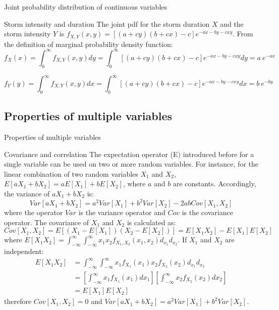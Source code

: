 \documentclass[8pt]{beamer}
\renewcommand{\emph}[1]{\textcolor{myorange}{#1}}
\begin{document}
\begin{frame}{Joint probability distribution of continuous variables}
    \begin{exampleblock}{Storm intensity and duration}
        The joint \emph{pdf} for the storm duration $X$ and the storm intensity $Y$ is $f_{X,Y} (x,y) = \left[ (a+cy)(b+cx)-c \right]e^{-ax-by-cxy}$. From the definition of marginal probability density function:
\[
            \displaystyle
            f_X (x) =  \int_{0}^{\infty} f_{X,Y} (x,y) dy = \int_{0}^{\infty} \left[ (a+cy)(b+cx)-c \right]e^{-ax-by-cxy} dy  = a \ e^{-ax}
        \]

\[
            \displaystyle
            f_Y (y) =  \int_{0}^{\infty} f_{X,Y} (x,y) dx = \int_{0}^{\infty} \left[ (a+cy)(b+cx)-c \right]e^{-ax-by-cxy} dx = b \ e^{-by}
        \]

    \end{exampleblock}
\end{frame}

\subsection{Properties of multiple variables} %

\begin{frame}{Properties of multiple variables}

    \begin{block}{Covariance and correlation}
        The \emph{expectation operator (E)} introduced before for a single variable can be used on two or more random variables. For instance, for the linear combination of two random variables $X_1$ and $X_2$, $E[a X_1 + b X_2 ] = aE[X_1 ]+bE[X_2 ]$, where $a$ and $b$ are constants. Accordingly, the variance of $aX_1 + bX_2$ is:
        \[
            Var[aX_1 + bX_2] = a^2 Var[X_1] + b^2 Var[X_2]- 2ab Cov[X_1 , X_2]
        \]
        where the operator $Var$ is the variance operator and $Cov$ is the \alert{covariance} operator. The \alert{covariance} of $X_1$ and $X_2$ is calculated as:
        \[
            Cov[X_1 , X_2 ] = E[(X_1 - E[X_1]) (X_2 - E[X_2])] = E[X_1 X_2]-E[X_1] E[X_2] 
        \]
        where $ E[X_1 X_2] = \int_{-\infty}^{\infty} \int_{-\infty}^{\infty} x_1 x_2 f_{X_1 , X_2} (x_1, x_2) d_{x_1} d_{x_2}$. If $X_1$ and $X_2$ are independent:
         \begin{align*}
         E[X_1 X_2] &= \int_{-\infty}^{\infty} \int_{-\infty}^{\infty} x_1 f_{X_1}(x_1) x_2 f_{X_2}(x_2)  d_{x_1} d_{x_2} \\
                        &=\left[ \int_{-\infty}^{\infty} x_1 f_{X_1} (x_1) dx_1 \right]\left[ \int_{-\infty}^{\infty} x_2 f_{X_2} (x_2) dx_2 \right] \\
                        &= E[X_1] E[X_2]
        \end{align*}
        therefore $Cov[X_1 , X_2 ] = 0$ and $Var[aX_1 + bX_2] = a^2 Var[X_1] + b^2 Var[X_2]$. 
    \end{block}

\end{frame}
\end{document}
